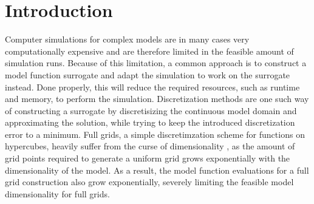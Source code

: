 \documentclass[
  a4paper,  %
  twoside,  %
  bibliography=totoc,
  headsepline,
  cleardoublepage=empty,
  parskip=half,
  draft=false
]{scrbook}
\begin{document}
\renewcommand*{\chapterpagestyle}{scrplain}
\pagestyle{scrheadings}
\pagestyle{scrheadings}
\ihead[]{}
\chead[]{}
\ohead[]{\headmark}
\cfoot[]{}
\ifoot[]{}

































%
%


\chapter{Introduction}
\label{chap:c1}

\setcounter{page}{1}

Computer simulations for complex models are in many cases very computationally expensive and are therefore limited in the feasible amount of simulation runs.
Because of this limitation, a common approach is to construct a model function surrogate and adapt the simulation to work on the surrogate instead.
Done properly, this will reduce the required resources, such as runtime and memory, to perform the simulation.
Discretization methods \cite{Stetter1973} are one such way of constructing a surrogate by discretisizing the continuous model domain and approximating the solution, while trying to keep the introduced discretization error to a minimum.
Full grids, a simple discretimzation scheme for functions on hypercubes, heavily suffer from the curse of dimensionality \cite{Bellman1961}, as the amount of grid points required to generate a uniform grid grows exponentially with the dimensionality of the model.
As a result, the model function evaluations for a full grid construction also grow exponentially, severely limiting the feasible model dimensionality for full grids.
\end{document}
